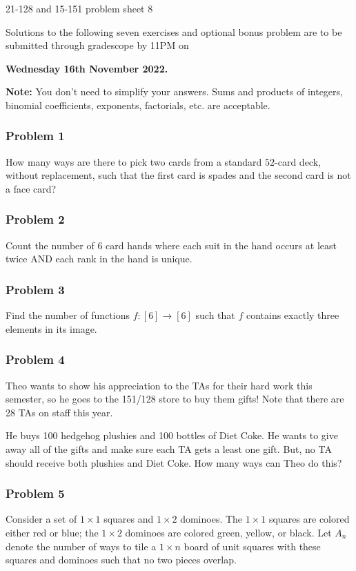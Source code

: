 \newpage\documentclass[11pt,onecolumn,fleqn]{article}
\theoremstyle{definition}
\begin{document}
\thispagestyle{empty}
\begin{center}
{\Huge 21-128 and 15-151 problem sheet 8}

Solutions to the following seven exercises and optional bonus problem are to be submitted through 
gradescope by 11PM on

\textbf{Wednesday 16th November 2022.}

\end{center}

\textbf{Note:} You don't need to simplify your answers. Sums and products of integers, binomial coefficients, exponents, factorials, etc. are acceptable.

\subsubsection*{Problem 1}
How many ways are there to pick two cards from a standard $52$-card deck, without replacement, such that the first card is spades and the second card is not a face card?


\subsubsection*{Problem 2}
Count the number of 6 card hands where each suit in the hand occurs at least twice AND each rank in the hand is unique.


\subsubsection*{Problem 3}
Find the number of functions $f: [6] \to [6]$ such that $f$ contains exactly three elements in its image.


\subsubsection*{Problem 4}
Theo wants to show his appreciation to the TAs for their hard work this semester, so he goes to the 151/128 store to buy them gifts! Note that there are 28 TAs on staff this year.

He buys 100 hedgehog plushies and 100 bottles of Diet Coke. He wants to give away all of the gifts and make sure each TA gets a least one gift. But, no TA should receive both plushies and Diet Coke. How many ways can Theo do this?

\newpage

\subsubsection*{Problem 5}
Consider a set of $1\times 1$ squares and $1\times 2$ dominoes.  The $1\times 1$ squares are colored either red or blue; 
the $1\times 2$ dominoes are colored green, yellow, or black.  Let $A_n$ denote the number of ways to tile a $1\times n$ 
board of unit squares with these squares and dominoes such that no two pieces overlap.
\end{document}
